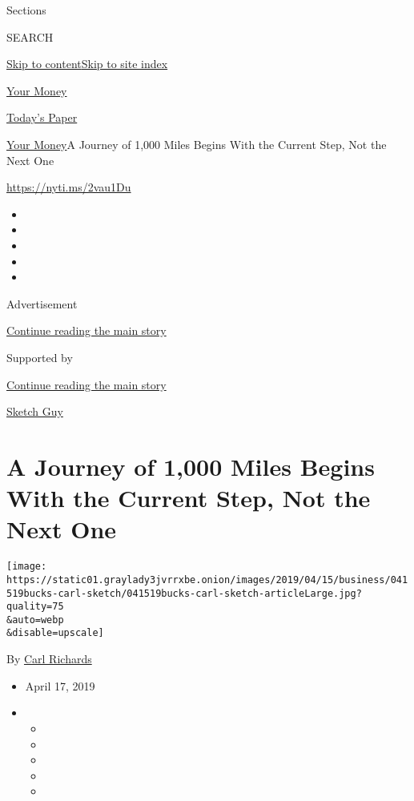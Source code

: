 Sections

SEARCH

\protect\hyperlink{site-content}{Skip to
content}\protect\hyperlink{site-index}{Skip to site index}

\href{https://www.nytimes3xbfgragh.onion/section/your-money}{Your Money}

\href{https://myaccount.nytimes3xbfgragh.onion/auth/login?response_type=cookie\&client_id=vi}{}

\href{https://www.nytimes3xbfgragh.onion/section/todayspaper}{Today's
Paper}

\href{/section/your-money}{Your Money}\textbar{}A Journey of 1,000 Miles
Begins With the Current Step, Not the Next One

\url{https://nyti.ms/2vau1Du}

\begin{itemize}
\item
\item
\item
\item
\item
\end{itemize}

Advertisement

\protect\hyperlink{after-top}{Continue reading the main story}

Supported by

\protect\hyperlink{after-sponsor}{Continue reading the main story}

\href{/column/sketch-guy}{Sketch Guy}

\hypertarget{a-journey-of-1000-miles-begins-with-the-current-step-not-the-next-one}{%
\section{A Journey of 1,000 Miles Begins With the Current Step, Not the
Next
One}\label{a-journey-of-1000-miles-begins-with-the-current-step-not-the-next-one}}

\texttt{[image: https://static01.graylady3jvrrxbe.onion/images/2019/04/15/business/041519bucks-carl-sketch/041519bucks-carl-sketch-articleLarge.jpg?quality=75\\\&auto=webp\\\&disable=upscale]}

By \href{https://www.nytimes3xbfgragh.onion/by/carl-richards}{Carl
Richards}

\begin{itemize}
\item
  April 17, 2019
\item
  \begin{itemize}
  \item
  \item
  \item
  \item
  \item
  \end{itemize}
\end{itemize}

